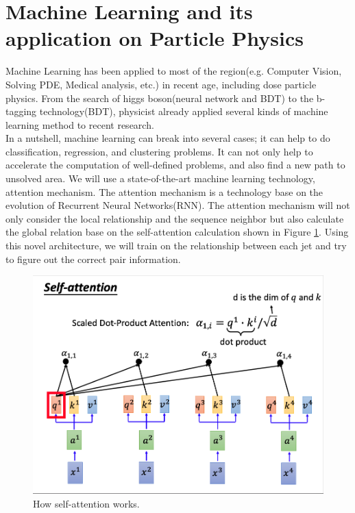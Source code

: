 \section{Machine Learning and its application on Particle Physics}

Machine Learning has been applied to most of the region(e.g. Computer Vision, Solving PDE, Medical analysis, etc.) in recent age, including dose particle physics. From the search of higgs boson(neural network and BDT) to the b-tagging technology(BDT\cite{Paganini:2017dpd}), physicist already applied several kinds of machine learning method to recent research.
\\
In a nutshell, machine learning can break into several cases; it can help to do classification, regression, and clustering problems. It can not only help to accelerate the computation of well-defined problems, and also find a new path to unsolved area. We will use a state-of-the-art machine learning technology, attention mechanism.\cite{A.Vaswani:2017} The attention mechanism is a technology base on the evolution of Recurrent Neural Networks(RNN).\cite{A.Vaswani:2017} The attention mechanism will not only consider the local relationship and the sequence neighbor but also calculate the global relation base on the self-attention calculation shown in Figure \ref{fig:attention}. Using this novel architecture, we will train on the relationship between each jet and try to figure out the correct pair information.
\\
\begin{figure}[h]
	\centering
	\includegraphics[width=0.8\linewidth]{Figures/attention.png}
	\caption{How self-attention works.\cite{HY.Lee:2019}}
	\label{fig:attention}
\end{figure}
